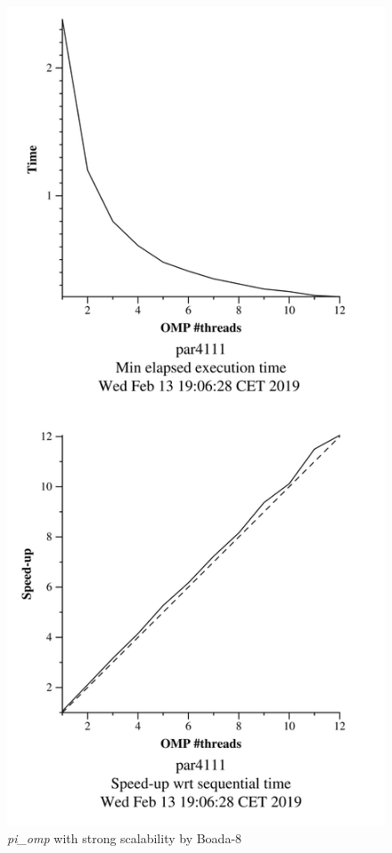 \documentclass[12]{article}
\begin{document}
\begin{figure}[H]
\centering
\includegraphics[scale=0.15]{images/pi_omp-1000000000-1-12-3-strong-boada-8.png}
 \caption{ \textit{pi\_omp} with strong scalability by Boada-8}
  \label{fig:pi_strong_ompboada8}
\end{figure}
\end{document}
